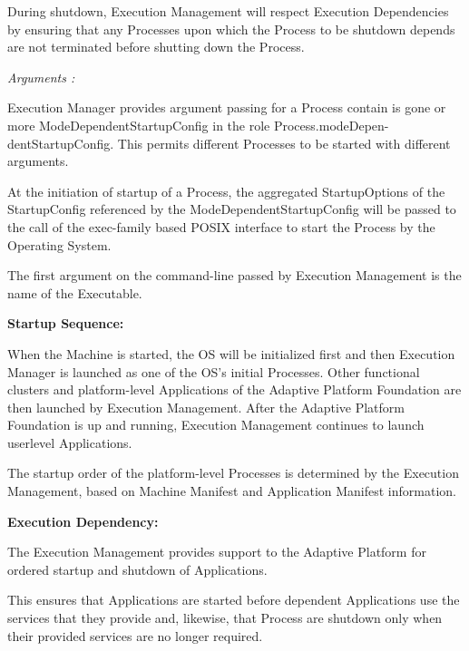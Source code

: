 \begin{DoxyItemize}
\begin{DoxyItemize}
\begin{DoxyItemize}
\item During shutdown, Execution Management will respect Execution Dependencies by ensuring that any Processes upon which the Process to be shutdown depends are not terminated before shutting down the Process.
\end{DoxyItemize}
\item {\itshape Arguments \+:}
\begin{DoxyItemize}
\item Execution Manager provides argument passing for a Process contain is gone or more Mode\+Dependent\+Startup\+Config in the role Process.\+mode\+Depen-\/dent\+Startup\+Config. This permits different Processes to be started with different arguments.
\item At the initiation of startup of a Process, the aggregated Startup\+Options of the Startup\+Config referenced by the Mode\+Dependent\+Startup\+Config will be passed to the call of the exec-\/family based P\+O\+S\+IX interface to start the Process by the Operating System.
\item The first argument on the command-\/line passed by Execution Management is the name of the Executable.
\end{DoxyItemize}
\end{DoxyItemize}
\item {\bfseries Startup Sequence\+:}
\begin{DoxyItemize}
\item When the Machine is started, the OS will be initialized first and then Execution Manager is launched as one of the O\+S’s initial Processes. Other functional clusters and platform-\/level Applications of the Adaptive Platform Foundation are then launched by Execution Management. After the Adaptive Platform Foundation is up and running, Execution Management continues to launch userlevel Applications.
\item The startup order of the platform-\/level Processes is determined by the Execution Management, based on Machine Manifest and Application Manifest information. 
\end{DoxyItemize}
\item {\bfseries Execution Dependency\+:}
\begin{DoxyItemize}
\item The Execution Management provides support to the Adaptive Platform for ordered startup and shutdown of Applications.
\item This ensures that Applications are started before dependent Applications use the services that they provide and, likewise, that Process are shutdown only when their provided services are no longer required.

\end{DoxyItemize}
\end{DoxyItemize}

